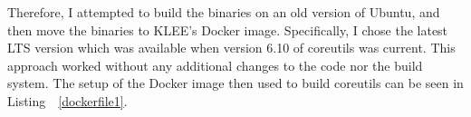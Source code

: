 \documentclass{article}
\let\savedRef=\ref
\renewcommand{\ref}{\unskip~\savedRef}
\begin{document}
\begin{multicols}{2}
    Therefore, I attempted to build the binaries on an old version of Ubuntu, and then move the binaries to KLEE's Docker image. Specifically, I chose the latest LTS version which was available when version 6.10 of coreutils was current. This approach worked without any additional changes to the code nor the build system. The setup of the Docker image then used to build coreutils can be seen in Listing~\ref{dockerfile1}.

\end{multicols}


\end{document}
